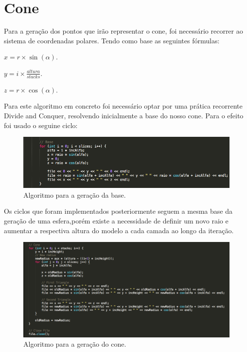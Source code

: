 \documentclass{article}
\begin{document}
\newpage
\section{Cone}

Para a geração dos pontos que irão representar o cone, foi necessário recorrer ao 
sistema de coordenadas polares. Tendo como base as seguintes fórmulas:

\par$x = r\times\sin(\alpha)$\newline.

\par$y =i\times\frac{altura}{stacks}$\newline.

\par$z=r\times\cos(\alpha)$\newline.


Para este algoritmo em concreto foi necessário optar por uma prática recorrente 
Divide and Conquer, resolvendo inicialmente a base do nosso cone.
Para o efeito foi usado o seguine ciclo:

\begin{figure}[H]
\centering\includegraphics[scale=0.45]{basecone} 
\caption{\label{fig:controller}Algoritmo para a geração da base.}
\end{figure} 



Os ciclos que foram implementados posteriormente seguem a mesma base da geração de uma esfera,porém existe
a necessidade de definir um novo raio e aumentar a respectiva altura do modelo a cada
camada ao longo da iteração.

\begin{figure}[H]
\centering\includegraphics[scale=0.45]{conefinal} 
\caption{\label{fig:controller}Algoritmo para a geração do cone.}
\end{figure} 
\end{document}
